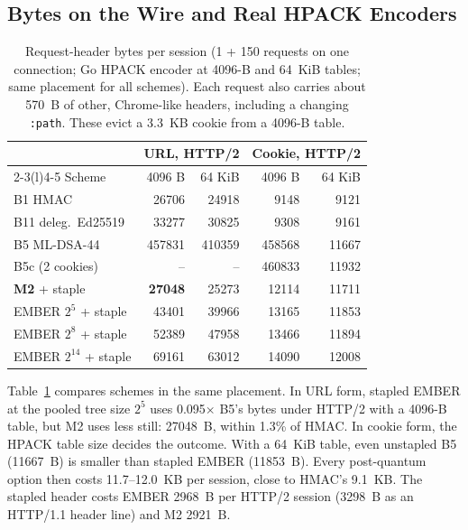 \subsection{Bytes on the Wire and Real HPACK Encoders}
\label{sec:res-wire}

\begin{table}[t]
\centering
\caption{Request-header bytes per session (1 + 150 requests on one connection; Go HPACK encoder at 4096-B and 64~KiB tables; same placement for all schemes). Each request also carries about 570~B of other, Chrome-like headers, including a changing \texttt{:path}. These evict a 3.3~KB cookie from a 4096-B table.}
\label{tab:wire}
\footnotesize
\setlength{\tabcolsep}{2.5pt}
\begin{tabular}{@{}lrrrr@{}}
\toprule
 & \multicolumn{2}{c}{URL, HTTP/2} & \multicolumn{2}{c}{Cookie, HTTP/2} \\
\cmidrule(lr){2-3}\cmidrule(l){4-5}
Scheme & 4096 B & 64 KiB & 4096 B & 64 KiB \\
\midrule
B1 HMAC & \num{26706} & \num{24918} & \num{9148} & \num{9121} \\
B11 deleg.\ Ed25519 & \num{33277} & \num{30825} & \num{9308} & \num{9161} \\
B5 ML-DSA-44 & \num{457831} & \num{410359} & \num{458568} & \num{11667} \\
B5c (2 cookies) & -- & -- & \num{460833} & \num{11932} \\
\textbf{M2} + staple & \textbf{\num{27048}} & \num{25273} & \num{12114} & \num{11711} \\
EMBER $2^5$ + staple & \num{43401} & \num{39966} & \num{13165} & \num{11853} \\
EMBER $2^8$ + staple & \num{52389} & \num{47958} & \num{13466} & \num{11894} \\
EMBER $2^{14}$ + staple & \num{69161} & \num{63012} & \num{14090} & \num{12008} \\
\bottomrule
\end{tabular}
\end{table}

Table~\ref{tab:wire} compares schemes in the same placement. In URL form, stapled EMBER at the pooled tree size $2^5$ uses 0.095$\times$ B5's bytes under HTTP/2 with a 4096-B table, but M2 uses less still: \num{27048}~B, within 1.3\% of HMAC. In cookie form, the HPACK table size decides the outcome. With a 64~KiB table, even unstapled B5 (\num{11667}~B) is smaller than stapled EMBER (\num{11853}~B). Every post-quantum option then costs 11.7--12.0~KB per session, close to HMAC's 9.1~KB. The stapled header costs EMBER \num{2968}~B per HTTP/2 session (\num{3298}~B as an HTTP/1.1 header line) and M2 \num{2921}~B.

